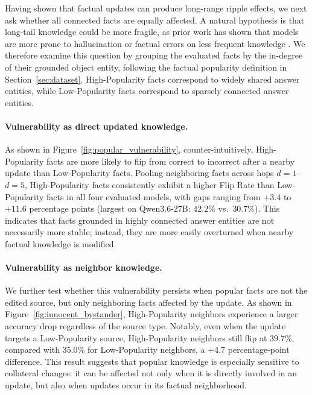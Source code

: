 Having shown that factual updates can produce long-range ripple effects, we next ask whether all connected facts are equally affected.
A natural hypothesis is that long-tail knowledge could be more fragile, as prior work has shown that models are more prone to hallucination or factual errors on less frequent knowledge .
We therefore examine this question by grouping the evaluated facts by the in-degree of their grounded object entity, following the factual popularity definition in Section~\ref{sec:dataset}.
High-Popularity facts correspond to widely shared answer entities, while Low-Popularity facts correspond to sparsely connected answer entities.


\paragraph{Vulnerability as direct updated knowledge.}
As shown in Figure~\ref{fig:popular_vulnerability}, counter-intuitively, High-Popularity facts are more likely to flip from correct to incorrect after a nearby update than Low-Popularity facts.
Pooling neighboring facts across hops $d{=}1$--$d{=}5$, High-Popularity facts consistently exhibit a higher Flip Rate than Low-Popularity facts in all four evaluated models, with gaps ranging from $+3.4$ to $+11.6$ percentage points (largest on Qwen3.6-27B: $42.2\%$ vs.\ $30.7\%$).
This indicates that facts grounded in highly connected answer entities are not necessarily more stable; instead, they are more easily overturned when nearby factual knowledge is modified.

\paragraph{Vulnerability as neighbor knowledge.}
We further test whether this vulnerability persists when popular facts are not the edited source, but only neighboring facts affected by the update. 
As shown in Figure~\ref{fig:innocent_bystander}, High-Popularity neighbors experience a larger accuracy drop regardless of the source type. 
Notably, even when the update targets a Low-Popularity source, High-Popularity neighbors still flip at $39.7\%$, compared with $35.0\%$ for Low-Popularity neighbors, a $+4.7$ percentage-point difference.
This result suggests that popular knowledge is especially sensitive to collateral changes: it can be affected not only when it is directly involved in an update, but also when updates occur in its factual neighborhood.

